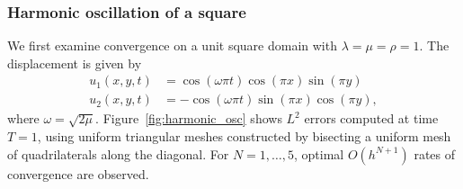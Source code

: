 \documentclass{siamart0216}
\begin{document}
\subsubsection{Harmonic oscillation of a square} 

We first examine convergence  on a unit square domain with  $\lambda = \mu = \rho = 1$.   The displacement is given by
\begin{align*}
u_1(x,y,t) &= \cos(\omega\pi t)\cos(\pi x)\sin(\pi y)\\
u_2(x,y,t) &= -\cos(\omega\pi t)\sin(\pi x)\cos(\pi y),
\end{align*}
where $\omega = \sqrt{2\mu}$.  Figure~\ref{fig:harmonic_osc} shows $L^2$ errors computed at time $T = 1$, using uniform triangular meshes constructed by bisecting a uniform mesh of quadrilaterals along the diagonal.  For $N = 1,\ldots, 5$, optimal $O(h^{N+1})$ rates of convergence are observed.  
\end{document}
